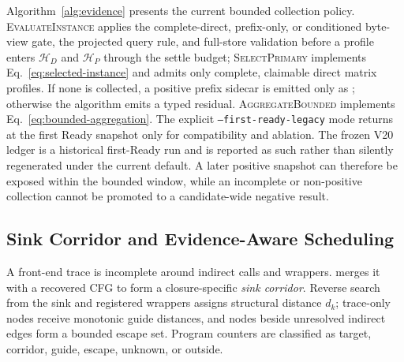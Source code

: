 Algorithm~\ref{alg:evidence} presents the current bounded collection policy.
\textsc{EvaluateInstance} applies the complete-direct, prefix-only, or conditioned byte-view gate,
the projected query rule, and full-store validation before a profile enters
$\mathcal H_D$ and $\mathcal H_P$ through the settle budget;
\textsc{SelectPrimary} implements Eq.~\ref{eq:selected-instance} and admits
only complete, claimable direct matrix profiles. If none is collected, a
positive prefix sidecar is emitted only as \psat; otherwise the algorithm emits
a typed residual. \textsc{AggregateBounded} implements
Eq.~\ref{eq:bounded-aggregation}. The
explicit \texttt{--first-ready-legacy} mode returns at the first Ready
snapshot only for compatibility and ablation. The frozen V20 ledger is a
historical first-Ready run and is reported as such rather than silently
regenerated under the current default. A later positive snapshot can therefore
be exposed within the bounded window, while an incomplete or non-positive
collection cannot be promoted to a candidate-wide negative result.

\subsection{Sink Corridor and Evidence-Aware Scheduling}
\label{sec:scheduler}

A front-end trace is incomplete around indirect calls and wrappers. \tool
merges it with a recovered CFG to form a closure-specific \emph{sink corridor}.
Reverse search from the sink and registered wrappers assigns structural
distance $d_k$; trace-only nodes receive monotonic guide distances, and nodes
beside unresolved indirect edges form a bounded escape set. Program counters
are classified as target, corridor, guide, escape, unknown, or outside.

